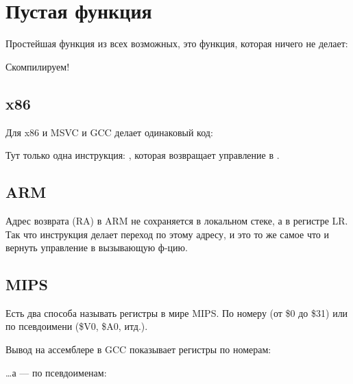\section{Пустая функция}
\label{empty_func}

Простейшая функция из всех возможных, это функция, которая ничего не делает:



Скомпилируем!

\subsection{x86}

Для x86 и MSVC и GCC делает одинаковый код:



Тут только одна инструкция: \RET, которая возвращает управление в .

\subsection{ARM}



Адрес возврата (\ac{RA}) в ARM не сохраняется в локальном стеке, а в регистре \ac{LR}.
Так что инструкция  делает переход по этому адресу, и это то же самое что и вернуть управление
в вызывающую ф-цию.

\subsection{MIPS}

Есть два способа называть регистры в мире MIPS. По номеру (от \$0 до \$31) или по псевдоимени (\$V0, \$A0, итд.).

Вывод на ассемблере в GCC показывает регистры по номерам:



\dots а \IDA --- по псевдоименам:




